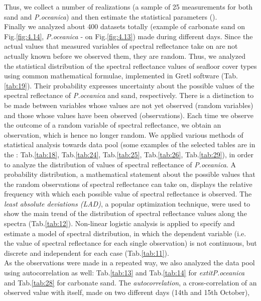 \documentclass[10pt, a4paper]{article}
\begin{document}
Thus, we collect a number of realizations (a sample of 25 measurements for both sand and \textit{P.oceanica}) and then estimate the statistical parameters (). \\
Finally we analyzed about 400 datasets totally (example of carbonate sand on Fig.\ref{fig:4.14}, \textit{P.oceanica} - on  Fig.\ref{fig:4.13}) made during different days. 
Since the actual values that measured variables of spectral reflectance take on are not actually known before we observed them, they are random. 
Thus, we analyzed the statistical distribution of the spectral reflectance values of seafloor cover types using common mathematical formulae, implemented in Gretl software (Tab.\ref{tab:19}). 
Their probability expresses uncertainty about the possible values of the spectral reflectance of \textit{P.oceanica} and sand, respectively.
There is a distinction to be made between variables whose values are not yet observed (random variables) and those whose values have been observed (observations). 
Each time we observe the outcome of a random variable of spectral reflectance, we obtain an observation, which is hence no longer random. 
We applied various methods of statistical analysis towards data pool (some examples of the selected tables are in the : Tab.\ref{tab:18}, Tab.\ref{tab:24}, Tab.\ref{tab:25}, Tab.\ref{tab:26}, Tab.\ref{tab:29}), in order to analyze the distribution of values of spectral reflectance of \textit{P.oceanica}. 
A probability distribution, a mathematical statement about the possible values that the random observations of spectral reflectance can take on, displays the relative frequency with which each possible value of spectral reflectance is observed. 
The \textit{least absolute deviations (LAD)}, a popular optimization technique, were used to show the main trend of the distribution of spectral reflectance values along the spectra (Tab.\ref{tab:12}). Non-linear logistic analysis is applied to specify and estimate a model of spectral distribution, in which the dependent variable (i.e. the value of spectral reflectance for each single observation) is not continuous, but discrete and independent for each case (Tab.\ref{tab:11}). \\
As the observations were made in a repeated way, we also analyzed the data pool using autocorrelation as well: Tab.\ref{tab:13} and Tab.\ref{tab:14} for \textit{	extit{P.oceanica}} and Tab.\ref{tab:28} for carbonate sand. The \textit{autocorrelation}, a cross-correlation of an observed value with itself, made on two different days (14th and 15th October),
\end{document}
